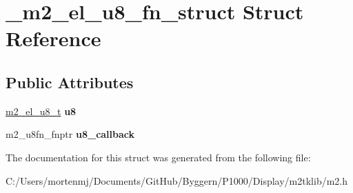 \hypertarget{struct__m2__el__u8__fn__struct}{\section{\-\_\-m2\-\_\-el\-\_\-u8\-\_\-fn\-\_\-struct Struct Reference}
\label{struct__m2__el__u8__fn__struct}
}
\subsection*{Public Attributes}
\begin{DoxyCompactItemize}
\item 
\hypertarget{struct__m2__el__u8__fn__struct_a707d8f4464874e9032cae9b7e75e26e3}{\hyperlink{struct__m2__el__u8__struct}{m2\-\_\-el\-\_\-u8\-\_\-t} {\bfseries u8}}\label{struct__m2__el__u8__fn__struct_a707d8f4464874e9032cae9b7e75e26e3}

\item 
\hypertarget{struct__m2__el__u8__fn__struct_a0cfd5e1e81d74da18079c52e59f03359}{m2\-\_\-u8fn\-\_\-fnptr {\bfseries u8\-\_\-callback}}\label{struct__m2__el__u8__fn__struct_a0cfd5e1e81d74da18079c52e59f03359}

\end{DoxyCompactItemize}


The documentation for this struct was generated from the following file\-:\begin{DoxyCompactItemize}
\item 
C\-:/\-Users/mortenmj/\-Documents/\-Git\-Hub/\-Byggern/\-P1000/\-Display/m2tklib/m2.\-h\end{DoxyCompactItemize}
